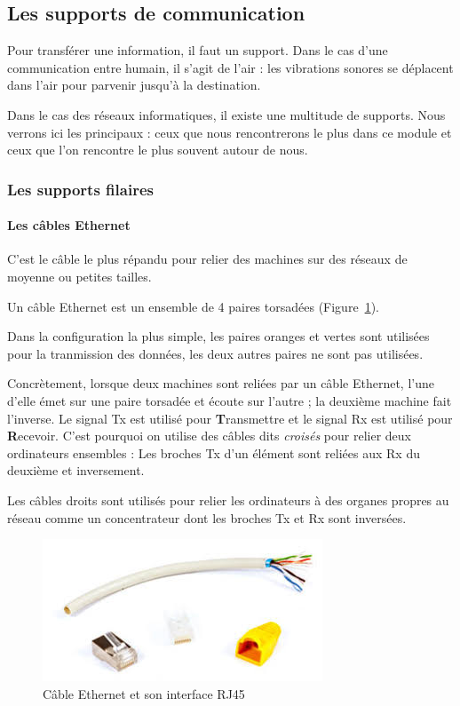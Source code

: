 \subsection{Les supports de communication}

Pour transférer une information, il faut un support. Dans le cas d'une communication entre humain, il s'agit de l'air : les vibrations sonores se déplacent dans l'air pour parvenir jusqu'à la destination.

Dans le cas des réseaux informatiques, il existe une multitude de supports. Nous verrons ici les principaux : ceux que nous rencontrerons le plus dans ce module et ceux que l'on rencontre le plus souvent autour de nous.

\subsubsection{Les supports filaires}

\paragraph{Les câbles Ethernet}
C'est le câble le plus répandu pour relier des machines sur des réseaux de moyenne ou petites tailles.

Un câble Ethernet est un ensemble de 4 paires torsadées (Figure~\ref{fig:cableEthernet}).

Dans la configuration la plus simple, les paires oranges et vertes sont utilisées pour la tranmission des données, les deux autres paires ne sont pas utilisées.

Concrètement, lorsque deux machines sont reliées par un câble Ethernet, l'une d'elle émet sur une paire torsadée et écoute sur l'autre ; la deuxième machine fait l'inverse. Le signal Tx est utilisé pour \textbf{T}ransmettre et le signal Rx est utilisé pour \textbf{R}ecevoir. C'est pourquoi on utilise des câbles dits \textit{croisés} pour relier deux ordinateurs ensembles : Les broches Tx d'un élément sont reliées aux Rx du deuxième et inversement.

Les câbles droits sont utilisés pour relier les ordinateurs à des organes propres au réseau comme un concentrateur dont les broches Tx et Rx sont inversées.

\begin{figure}[ht]
  \centering
  \includegraphics[width=.3\textwidth]{images/materiel/cableEthernet}
  \caption{Câble Ethernet et son interface RJ45}
  \label{fig:cableEthernet}
\end{figure}

